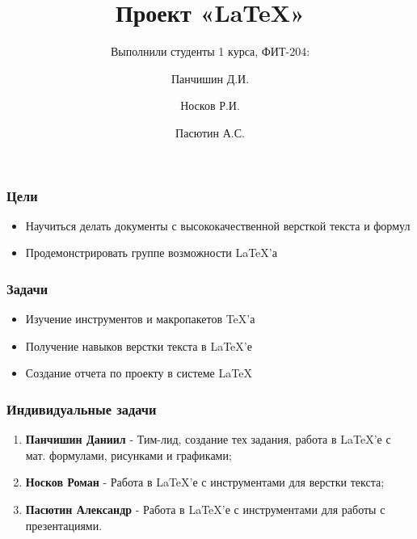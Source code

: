 \documentclass[russian, 14pt]{beamer}
\author[]{Панчишин Д.И.
\and Носков Р.И.
\and Пасютин А.С.
}
\title[Презентация]{Проект \textbf{«\LaTeX»}}
\subtitle{Выполнили студенты 1 курса, ФИТ-204:}
\date[]{}
\institute[]{\normalsize\textbf{КемГУ}}
\begin{document}
	
	\begin{frame}
		\maketitle
	\end{frame}

\begin{frame}
	\frametitle{Цели}
	\begin{itemize}
		\item Научиться делать документы с высококачественной версткой текста и формул
		\item Продемонстрировать группе возможности \LaTeX'а
	\end{itemize}
\end{frame}

\begin{frame}
	\frametitle{Задачи}
	\begin{itemize}
		\item Изучение инструментов и макропакетов \TeX’а
		\item Получение навыков верстки текста в \LaTeX'е
		\item Создание отчета по проекту в системе \LaTeX
	\end{itemize}
\end{frame}

\begin{frame}
	\frametitle{Индивидуальные задачи}
	\begin{enumerate}
		\item<1-> \textbf{Панчишин Даниил} - Тим-лид, создание тех задания, работа в \LaTeX’е с мат. формулами, рисунками и графиками;
		\item<2-> \textbf{Носков Роман} - Работа в \LaTeX’е с инструментами для верстки текста;
		\item<3-> \textbf{Пасютин Александр} - Работа в \LaTeX’е с инструментами для работы с презентациями.
	\end{enumerate}
\end{frame}
\end{document}
